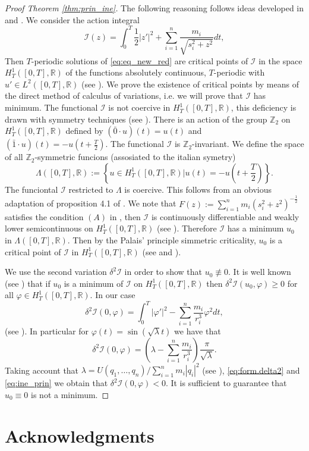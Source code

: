 \documentclass[twoside]{article}
\theoremstyle{remark}
\newcommand{\rr}{\mathbb{R}}
\begin{document}
\begin{proof}[Proof Theorem \ref{thm:prin_ine}] The following reasoning follows ideas developed in \cite{zhao2015nonplanar} and \cite{li2013characterization}.  We consider the action integral
\[\mathcal{I}(z)=\int_0^T\frac12|z'|^2+\sum_{i=1}^n\frac{m_i}{\sqrt{s_i^2+z^2}}dt,\]
Then $T$-periodic solutions of \eqref{eq:eq_new_red} are critical points of $\mathcal{I}$ in the space $H^1_T([0,T],\rr)$ of the functions  absolutely continuous, $T$-periodic with $u'\in L^2([0,T],\rr)$ (see \cite[Cor. 1.1]{Mawhin2010}). We prove the existence of critical points by means of the direct method of calculus of variations, i.e. we will prove that $\mathcal{I}$ has minimum.  The functional $\mathcal{I}$ is not coercive in $H^1_T([0,T],\rr)$,  this deficiency is drawn with symmetry techniques (see \cite{David-2004}). There is an action of the group $\mathbb{Z}_2$ on $H^1_T([0,T],\rr)$ defined by $(\bar{0}\cdot u)(t)=u(t)$ and $(\bar{1}\cdot u)(t)=-u(t+\frac{T}{2})$. The functional $\mathcal{I}$ is $\mathbb{Z}_2$-invariant. We define the space of all $\mathbb{Z}_2$-symmetric funcions (assosiated to the italian symetry) \[\Lambda([0,T],\mathbb{R}):=\left\{ u\in H^1_T([0,T],\rr) | u(t)=-u\left(t+\frac{T}{2}\right)\right\}.\]
The funciontal $\mathcal{I}$ restricted to $\Lambda$  is coercive. This follows from an obvious adaptation of proposition 4.1 of \cite{David-2004}. We note that $F(z):=\sum_{i=1}^nm_i(s_i^2+z^2)^{-\frac{1}{2}}$ satisfies the condition $(A)$ in \cite[p. 12]{Mawhin2010}, then $\mathcal{I}$  is continuously differentiable and weakly lower semicontinuous on $H_{T}^1([0,T],\rr)$ (see \cite[p. 13]{Mawhin2010}). Therefore $\mathcal{I}$ has a minimum $u_0$ in $\Lambda([0,T],\mathbb{R})$. Then by the Palais' principle simmetric criticality,  $u_0$ is a critical point of $\mathcal{I}$ in $H^1_T([0,T],\rr)$ (see \cite{David-2004} and \cite{RichardPalais274}).

We use the second variation $\delta^2 \mathcal{I}$ in order to show  that $u_0\nequiv 0$. It is well known (see \cite[Th. 1.3.1]{jost1998calculus}) that if $u_0$ is a minimum of $\mathcal{I}$ on $H^1_T([0,T],\rr)$  then $\delta^2 \mathcal{I} (u_0,\varphi)\geq 0$ for all $\varphi\in H^1_T([0,T],\rr)$. In our case
\[\delta^2\mathcal{I}(0,\varphi)=\int_0^T |\varphi'|^2-\sum_{i=1}^{n}\frac{m_i}{r_i^3}\varphi^2 dt,\]
(see \cite[Eq. 1.3.6]{jost1998calculus}). In particular for $\varphi(t)=\sin (\sqrt{\lambda}t)$ we have that
\begin{equation}\label{eq:form.delta2}
 \delta^2 \mathcal{I} (0,\varphi)=\left( \lambda-\sum_{i=1}^{n}\frac{m_i}{r_i^3} \right)\frac{\pi}{\sqrt{\lambda}}.
\end{equation}
Taking account that $\lambda=U(q_1,\ldots,q_n)/\sum_{i=1}^{n}m_i|q_i|^2$  (see \cite[p. 109]{JaumeLlibre276}),  \eqref{eq:form.delta2} and \eqref{eq:ine_prin} we obtain that $\delta^2\mathcal{I}(0,\varphi)<0$. It is sufficient  to guarantee that $u_0\equiv 0$ is not a minimum.
\end{proof}







\section*{Acknowledgments}




 
\end{document}
